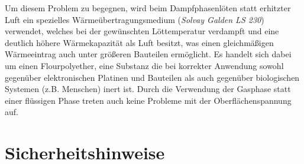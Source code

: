 \documentclass{\basedir/fablab-document}
\begin{document}
	Um diesem Problem zu begegnen, wird beim Dampfphasenlöten statt erhitzter Luft ein spezielles Wärmeübertragungsmedium (\textit{Solvay Galden LS 230}) verwendet, welches bei der gewünschten Löttemperatur verdampft und eine deutlich höhere Wärmekapazität als Luft besitzt, was einen gleichmäßigen Wärmeeintrag auch unter größeren Bauteilen ermöglicht. Es handelt sich dabei um einen Flourpolyether, eine Substanz die bei korrekter Anwendung sowohl gegenüber elektronischen Platinen und Bauteilen als auch gegenüber biologischen Systemen (z.B. Menschen) inert ist. Durch die Verwendung der Gasphase statt einer flüssigen Phase treten auch keine Probleme mit der Oberflächenspannung auf.
	
	\section{Sicherheitshinweise}
	
\end{document}
